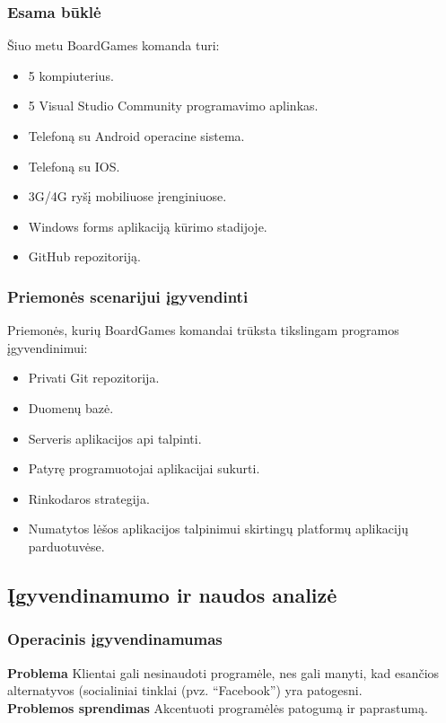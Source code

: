 \documentclass{VUMIFPSkursinis}
\begin{document}
	\subsubsection {Esama būklė}
	Šiuo metu BoardGames komanda turi:
	\renewcommand{\labelitemi}{$\bullet$}
		\begin{itemize}
			\item 5 kompiuterius.
			\item 5 Visual Studio Community programavimo aplinkas.
			\item Telefoną su Android operacine sistema.
			\item Telefoną su IOS.
			\item 3G/4G ryšį mobiliuose įrenginiuose.
			\item Windows forms aplikaciją kūrimo stadijoje.
			\item GitHub repozitoriją.
		\end{itemize}	

	\subsubsection {Priemonės scenarijui įgyvendinti}
	Priemonės, kurių BoardGames komandai trūksta tikslingam programos įgyvendinimui:
	\renewcommand{\labelitemi}{$\bullet$}
		\begin{itemize}
			\item Privati Git repozitorija.
			\item Duomenų bazė.
			\item Serveris aplikacijos api talpinti.
			\item Patyrę programuotojai aplikacijai sukurti.
			\item Rinkodaros strategija.
			\item Numatytos lėšos aplikacijos talpinimui skirtingų platformų aplikacijų parduotuvėse.
		\end{itemize}	
\subsection {Įgyvendinamumo ir naudos analizė}		
	\subsubsection{Operacinis įgyvendinamumas}
		\noindent \textbf{Problema} Klientai gali nesinaudoti programėle, nes gali manyti, kad esančios alternatyvos (socialiniai tinklai (pvz. “Facebook”) yra patogesni.\\
		\noindent \textbf{Problemos sprendimas} Akcentuoti programėlės patogumą ir paprastumą. \\
\end{document}

